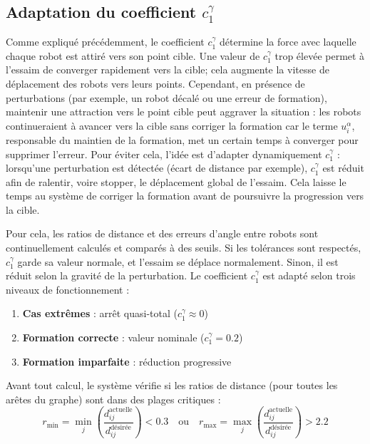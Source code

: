 \subsection{Adaptation du coefficient $c_{1}^{\gamma}$}

Comme expliqué précédemment, le coefficient $c_{1}^{\gamma}$ détermine la force avec laquelle chaque robot est attiré vers son point cible. 
Une valeur de $c_{1}^{\gamma}$ trop élevée permet à l'essaim de converger rapidement vers la cible; cela augmente la vitesse de déplacement des robots vers leurs points. Cependant, en présence de perturbations (par exemple, un robot décalé ou une erreur de formation), maintenir une attraction vers le point cible peut aggraver la situation : les robots continueraient à avancer vers la cible sans corriger la formation car le terme $u_{i}^{\alpha}$, responsable du maintien de la formation, met un certain temps à converger pour supprimer l'erreur. 
Pour éviter cela, l'idée est d'adapter dynamiquement $c_{1}^{\gamma}$ : lorsqu'une perturbation est détectée (écart de distance par exemple), $c_{1}^{\gamma}$ est réduit afin de ralentir, voire stopper, le déplacement global de l'essaim. Cela laisse le temps au système de corriger la formation avant de poursuivre la progression vers la cible.

Pour cela, les ratios de distance et des erreurs d'angle entre robots sont continuellement calculés et comparés à des seuils. Si les tolérances sont respectés, $c_{1}^{\gamma}$ garde sa valeur normale, et l'essaim se déplace normalement. Sinon, il est réduit selon la gravité de la perturbation.
Le coefficient $c_1^\gamma$ est adapté selon trois niveaux de fonctionnement :

\begin{enumerate}
\item \textbf{Cas extrêmes} : arrêt quasi-total ($c_1^\gamma \approx 0$)
\item \textbf{Formation correcte} : valeur nominale ($c_1^\gamma = 0.2$)
\item \textbf{Formation imparfaite} : réduction progressive
\end{enumerate}

Avant tout calcul, le système vérifie si les ratios de distance (pour toutes les arêtes du graphe) sont dans des plages critiques :
\begin{equation}
r_{\min} = \min_j \left(\frac{d_{ij}^{\text{actuelle}}}{d_{ij}^{\text{désirée}}}\right) < 0.3 \quad \text{ou} \quad r_{\max} = \max_j \left(\frac{d_{ij}^{\text{actuelle}}}{d_{ij}^{\text{désirée}}}\right) > 2.2
\end{equation}

